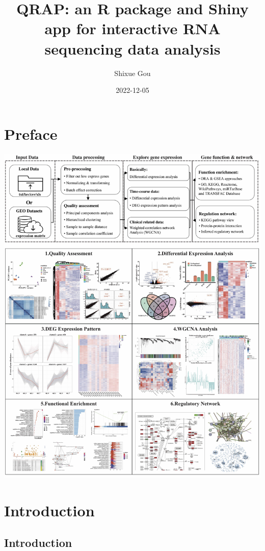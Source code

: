 \documentclass[
  a4paper,
  oneside]{book}
\title{QRAP: an R package and Shiny app for interactive RNA sequencing data analysis}
\author{Shixue Gou}
\date{2022-12-05}
\begin{document}
\maketitle

{
\hypersetup{linkcolor=}
\setcounter{tocdepth}{2}
\tableofcontents
}
\hypertarget{preface}{%
\chapter*{Preface}\label{preface}}

\includegraphics{images/workflow.jpg}

\hypertarget{intro}{%
\chapter{Introduction}\label{intro}}

\hypertarget{introduction}{%
\section{Introduction}\label{introduction}}
\end{document}

